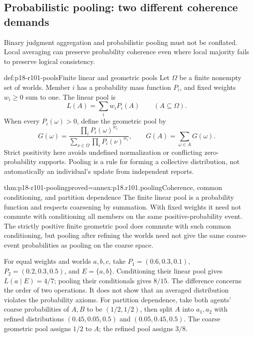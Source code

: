 \subsection{Probabilistic pooling: two different coherence demands}

Binary judgment aggregation and probabilistic pooling must not be
conflated. Local averaging can preserve probability coherence even where
local majority fails to preserve logical consistency.

\begin{hbdefinition}{def:p18-r101-pools}{Finite linear and geometric pools}
Let \(\Omega\) be a finite nonempty set of worlds. Member \(i\) has
a probability mass function \(P_i\), and fixed weights \(w_i\geq0\)
sum to one. The linear pool is
\[
 L(A)=\sum_i w_iP_i(A)\qquad(A\subseteq\Omega).
\]
When every \(P_i(\omega)>0\), define the geometric pool by
\[
 G(\omega)=\frac{\prod_iP_i(\omega)^{w_i}}
 {\sum_{\nu\in\Omega}\prod_iP_i(\nu)^{w_i}},
 \qquad G(A)=\sum_{\omega\in A}G(\omega).
\]
Strict positivity here avoids undefined normalization or conflicting
zero-probability supports. Pooling is a rule for forming a collective
distribution, not automatically an individual's update from independent
reports.
\end{hbdefinition}

\begin{hbtheorem}{thm:p18-r101-pooling}{proved=annex:p18.r101.pooling}{Coherence, common conditioning, and partition dependence}
The finite linear pool is a probability function and respects coarsening
by summation. With fixed weights it need not commute with conditioning
all members on the same positive-probability event. The strictly positive
finite geometric pool does commute with such common conditioning, but
pooling after refining the worlds need not give the same coarse-event
probabilities as pooling on the coarse space.
\end{hbtheorem}

For equal weights and worlds \(a,b,c\), take
\(P_1=(0.6,0.3,0.1)\), \(P_2=(0.2,0.3,0.5)\), and
\(E=\{a,b\}\). Conditioning their linear pool gives
\(L(a\mid E)=4/7\); pooling their conditionals gives \(8/15\).
The difference concerns the order of two operations. It does not show
that an averaged distribution violates the probability axioms.
For partition dependence, take both agents' coarse probabilities of
\(A,B\) to be \((1/2,1/2)\), then split \(A\) into \(a_1,a_2\)
with refined distributions \((0.45,0.05,0.5)\) and
\((0.05,0.45,0.5)\). The coarse geometric pool assigns \(1/2\)
to \(A\); the refined pool assigns \(3/8\).

